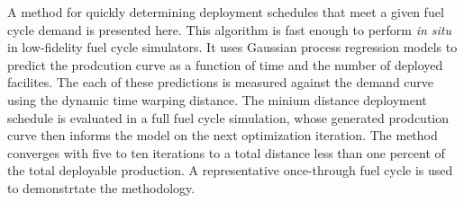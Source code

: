 A method for quickly determining deployment schedules that meet a given 
fuel cycle demand is presented here. This algorithm is fast enough to 
perform \emph{in situ} in low-fidelity fuel cycle simulators. It uses
Gaussian process regression models to predict the prodcution curve as a 
function of time and the number of deployed facilites. The each of these
predictions is measured against the demand curve using the dynamic time
warping distance. The minium distance deployment schedule is evaluated
in a full fuel cycle simulation, whose generated prodcution curve 
then informs the model on the next optimization iteration. The method
converges with five to ten iterations to a total distance less than one 
percent of the total deployable production. A representative once-through
fuel cycle is used to demonstrtate the methodology.